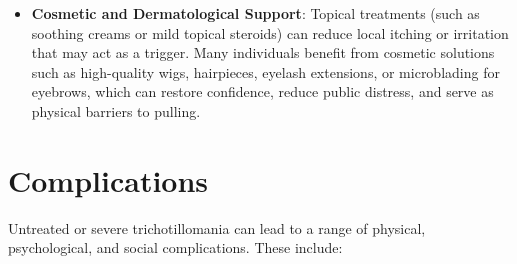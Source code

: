 \begin{itemize}
\begin{itemize}
        \item \textit{Clomipramine}: A tricyclic antidepressant (TCA) with strong serotonergic properties. It has shown efficacy in reducing pulling behavior in randomized controlled trials, though its use may be limited by side effects such as sedation, dry mouth, and constipation.
        \item \textit{Selective Serotonin Reuptake Inhibitors (SSRIs)}: E.g., fluoxetine, sertraline, fluvoxamine. While SSRIs are highly effective for treating comorbid anxiety and depression, clinical trials have shown mixed or limited efficacy for the hair-pulling behavior itself when it occurs in isolation.
        \item \textit{Atypical Antipsychotics}: In severe or treatment-resistant cases, low doses of atypical antipsychotics such as olanzapine or aripiprazole may be prescribed to assist with impulse control.
    \end{itemize}
    \item \textbf{Cosmetic and Dermatological Support}: Topical treatments (such as soothing creams or mild topical steroids) can reduce local itching or irritation that may act as a trigger. Many individuals benefit from cosmetic solutions such as high-quality wigs, hairpieces, eyelash extensions, or microblading for eyebrows, which can restore confidence, reduce public distress, and serve as physical barriers to pulling.
\end{itemize}

\section*{Complications}
Untreated or severe trichotillomania can lead to a range of physical, psychological, and social complications. These include:

